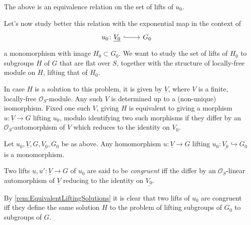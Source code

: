 \begin{rem}[]
	The above is an equivalence relation on the set of lifts of $u_0$.
\end{rem}


\noindent
Let's now study better this relation with the exponential map in the context of
\begin{equation*}
\begin{tikzcd}[row sep = 0ex
	,/tikz/column 1/.append style={anchor=base east}
	,/tikz/column 2/.append style={anchor=base west}]
	u_0\colon \underline{V_0} 
	\arrow[r, "", hookrightarrow] &
	G_0
\end{tikzcd}
\end{equation*} 
a monomorphism with image $H_0 \subset G_0$.
We want to study the set of lifts of $H_0$ to
subgroups $H$ of $G$ that are flat over $S$, together with the structure
of locally-free module on $H$, lifting that of $H_0$.


\begin{rem}\label{rem:EquivalentLiftingSolutions}
	In case $H$ is a solution to this problem, it is given by
	$\underline{V}$, where $V$ is a finite, locally-free $\mathcal{O}_{ S }$-module.
	Any such $V$ is determined up to a (non-unique) isomorphism.
	Fixed one such $V$, giving $H$ is equivalent to giving a morphism
	$u\colon \underline{V} \to G$ lifting $u_0$, modulo identifying
	two such morphisms if they differ by an $\mathcal{O}_{ S }$-automorphism
	of $V$ which reduces to the identity on $V_0$.
\end{rem}


\begin{lem}
	Let $u_0, \underline{V}, G, \underline{V_0}, G_0$ be as above.
	Any homomorphism $u\colon \underline{V} \to G$ lifting 
	$u_0\colon \underline{V_0} \hookrightarrow G_0$
	is a monomorphism.
\end{lem} 


\begin{defn}
	Two lifts $u, u'\colon \underline{V} \to G$ of $u_0$ are said to
	be \emph{congruent} iff the differ by an $\mathcal{O}_{ S }$-linear
	automorphism of $\underline{V}$ reducing to the identity on $\underline{V_0}$.
\end{defn}


\begin{rem}[]
	By \cref{rem:EquivalentLiftingSolutions} it is clear that
	two lifts of $u_0$ are congruent iff they define the same solution
	$H$ to the problem of lifting subgroups of $G_0$ to subgroups of $G$.
\end{rem}


